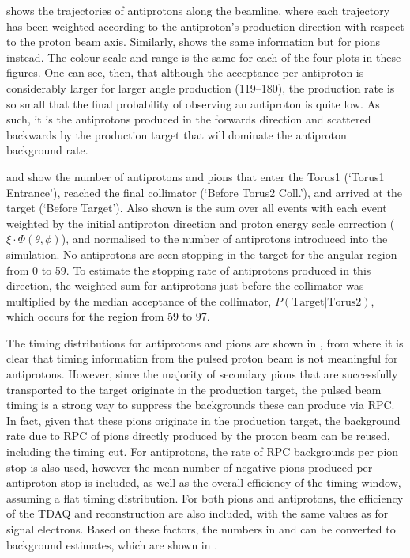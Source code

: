 \FigAntiprotonSimHeightsTwoDPbar
\FigAntiprotonSimHeightsTwoDPiMin
\TabAntiprotonResultsAntip
\TabAntiprotonResultsPiSecond
\afterpage{\clearpage}

 shows the trajectories of antiprotons along the beamline, where each trajectory has been weighted according to the antiproton's production direction with respect to the proton beam axis.
Similarly,  shows the same information but for pions instead.
The colour scale and range is the same for each of the four plots in these figures.
One can see, then, that although the acceptance per antiproton is considerably larger for larger angle production (119--180\degree), the production rate is so small that the final probability of observing an antiproton is quite low.
As such, it is the antiprotons produced in the forwards direction and scattered backwards by the production target that will dominate the antiproton background rate.

\FigAntiprotonSimTime
{} and  show the number of antiprotons and pions that enter the Torus1 (`Torus1 Entrance'), reached the final collimator (`Before Torus2 Coll.'), and arrived at the target (`Before Target').
Also shown is the sum over all events with each event weighted by the initial antiproton direction and proton energy scale correction ($\xi\cdot\Phi(\theta,\phi)$), and normalised to the number of antiprotons introduced into the simulation.
No antiprotons are seen stopping in the target for the angular region from 0 to 59\degree.
To estimate the stopping rate of antiprotons produced in this direction, 
the weighted sum for antiprotons just before the collimator was multiplied by the median acceptance of the collimator, $P(\textrm{Target}|\textrm{Torus2})$, which occurs for the region from 59 to 97\degree.

The timing distributions for antiprotons and pions are shown in , from where it is clear that timing information from the pulsed proton beam is not meaningful for antiprotons.
However, since the majority of secondary pions that are successfully transported to the target originate in the production target, the pulsed beam timing is a strong way to suppress the backgrounds these can produce via \ac{RPC}.
In fact, given that these pions originate in the production target, the background rate due to RPC of pions directly produced by the proton beam can be reused, including the timing cut.
For antiprotons, the rate of RPC backgrounds per pion stop is also used, however the mean number of negative pions produced per antiproton stop is included, as well as the overall efficiency of the timing window, assuming a flat timing distribution.
For both pions and antiprotons, the efficiency of the TDAQ and reconstruction are also included, with the same values as for signal electrons.
Based on these factors, the numbers in  and  can be converted to background estimates, which are shown in .
\TabAntiprotonEstimates

